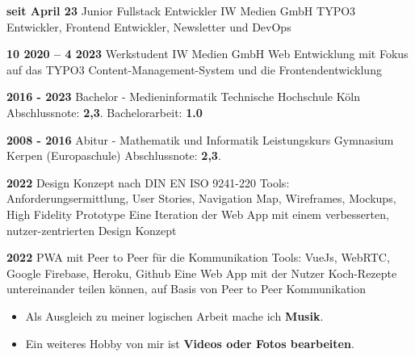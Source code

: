 \begin{paracol}{2}
\begin{rightcolumn}
\cveventAccent
	{\textbf{seit April 23}}
	{Junior Fullstack Entwickler}
	{IW Medien GmbH}
	{TYPO3 Entwickler, Frontend Entwickler, Newsletter und DevOps}
\vfill\null

\cvevent
	{\textbf{10 2020 – 4 2023}}
	{Werkstudent}
	{IW Medien GmbH}
	{Web Entwicklung mit Fokus auf das TYPO3 Content-Management-System und die Frontendentwicklung}
	{}
\vfill\null

{}

\cvevent
	{\textbf{2016 - 2023}}
	{Bachelor - Medieninformatik}
	{Technische Hochschule Köln}
	{Abschlussnote: \textbf{2,3}. Bachelorarbeit: \textbf{1.0}}
\vfill\null

\cvevent
	{\textbf{2008 - 2016}}
	{Abitur - Mathematik und Informatik Leistungskurs}
	{Gymnasium Kerpen (Europaschule)}
	{Abschlussnote: \textbf{2,3}.}
\vfill\null

\vfill\null
{}

\cvevent
	{\textbf{2022}}
	{Design Konzept nach DIN EN ISO 9241-220}
	{Tools: Anforderungsermittlung, User Stories, Navigation Map, Wireframes, Mockups, High Fidelity Prototype}
	{Eine Iteration der Web App mit einem verbesserten, nutzer-zentrierten Design Konzept}
\vfill\null

\cvevent
	{\textbf{2022}}
	{PWA mit Peer to Peer für die Kommunikation}
	{Tools: VueJs, WebRTC, Google Firebase, Heroku, Github}
	{Eine Web App mit der Nutzer Koch-Rezepte untereinander teilen können, auf Basis von Peer to Peer Kommunikation}
\vfill\null


\vfill\null
{}
\vspace{-0.3cm}
\begin{itemize}
  \item Als Ausgleich zu meiner logischen Arbeit mache ich \textbf{Musik}.
  \item Ein weiteres Hobby von mir ist \textbf{Videos oder Fotos bearbeiten}.
\end{itemize}
\vfill\null


\vfill
\vfill
\vfill
\end{rightcolumn}
\end{paracol}